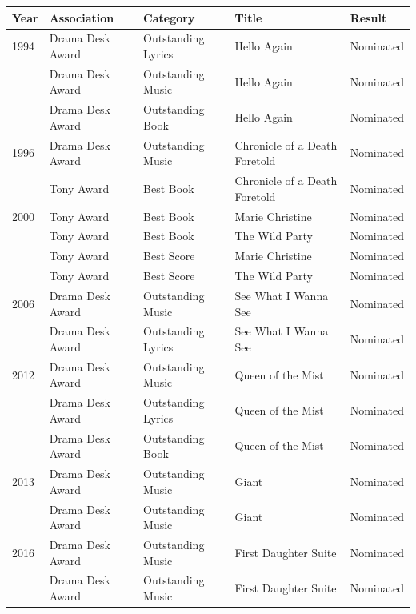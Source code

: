 \documentclass{article}
\begin{document}
\begin{tabular}{lllll}
\toprule
Year & Association & Category & Title & Result \\
\midrule
1994 & Drama Desk Award & Outstanding Lyrics & Hello Again & Nominated \\
 & Drama Desk Award & Outstanding Music & Hello Again & Nominated \\
 & Drama Desk Award & Outstanding Book & Hello Again & Nominated \\
1996 & Drama Desk Award & Outstanding Music & Chronicle of a Death Foretold & Nominated \\
 & Tony Award & Best Book & Chronicle of a Death Foretold & Nominated \\
2000 & Tony Award & Best Book & Marie Christine & Nominated \\
 & Tony Award & Best Book & The Wild Party & Nominated \\
 & Tony Award & Best Score & Marie Christine & Nominated \\
 & Tony Award & Best Score & The Wild Party & Nominated \\
2006 & Drama Desk Award & Outstanding Music & See What I Wanna See & Nominated \\
 & Drama Desk Award & Outstanding Lyrics & See What I Wanna See & Nominated \\
2012 & Drama Desk Award & Outstanding Music & Queen of the Mist & Nominated \\
 & Drama Desk Award & Outstanding Lyrics & Queen of the Mist & Nominated \\
 & Drama Desk Award & Outstanding Book & Queen of the Mist & Nominated \\
2013 & Drama Desk Award & Outstanding Music & Giant & Nominated \\
 & Drama Desk Award & Outstanding Music & Giant & Nominated \\
2016 & Drama Desk Award & Outstanding Music & First Daughter Suite & Nominated \\
 & Drama Desk Award & Outstanding Music & First Daughter Suite & Nominated \\
\bottomrule
\end{tabular}
\end{document}
